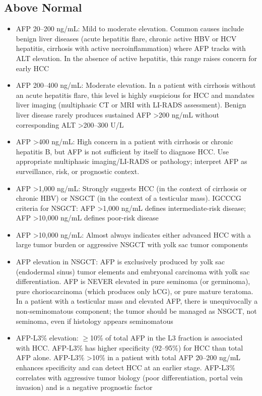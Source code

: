 \subsection*{Above Normal}
\begin{itemize}
  \item AFP 20--200 ng/mL: Mild to moderate elevation. Common causes include benign liver diseases (acute hepatitis flare, chronic active HBV or HCV hepatitis, cirrhosis with active necroinflammation) where AFP tracks with ALT elevation. In the absence of active hepatitis, this range raises concern for early HCC
  \item AFP 200--400 ng/mL: Moderate elevation. In a patient with cirrhosis without an acute hepatitis flare, this level is highly suspicious for HCC and mandates liver imaging (multiphasic CT or MRI with LI-RADS assessment). Benign liver disease rarely produces sustained AFP >200 ng/mL without corresponding ALT >200--300 U/L
  \item AFP >400 ng/mL: High concern in a patient with cirrhosis or chronic hepatitis B, but AFP is not sufficient by itself to diagnose HCC. Use appropriate multiphasic imaging/LI-RADS or pathology; interpret AFP as surveillance, risk, or prognostic context.
  \item AFP >1,000 ng/mL: Strongly suggests HCC (in the context of cirrhosis or chronic HBV) or NSGCT (in the context of a testicular mass). IGCCCG criteria for NSGCT: AFP >1,000 ng/mL defines intermediate-risk disease; AFP >10,000 ng/mL defines poor-risk disease
  \item AFP >10,000 ng/mL: Almost always indicates either advanced HCC with a large tumor burden or aggressive NSGCT with yolk sac tumor components
  \item AFP elevation in NSGCT: AFP is exclusively produced by yolk sac (endodermal sinus) tumor elements and embryonal carcinoma with yolk sac differentiation. AFP is NEVER elevated in pure seminoma (or germinoma), pure choriocarcinoma (which produces only hCG), or pure mature teratoma. In a patient with a testicular mass and elevated AFP, there is unequivocally a non-seminomatous component; the tumor should be managed as NSGCT, not seminoma, even if histology appears seminomatous
  \item AFP-L3\% elevation: $\geq$10\% of total AFP in the L3 fraction is associated with HCC. AFP-L3\% has higher specificity (92--95\%) for HCC than total AFP alone. AFP-L3\% >10\% in a patient with total AFP 20--200 ng/mL enhances specificity and can detect HCC at an earlier stage. AFP-L3\% correlates with aggressive tumor biology (poor differentiation, portal vein invasion) and is a negative prognostic factor

\end{itemize}
